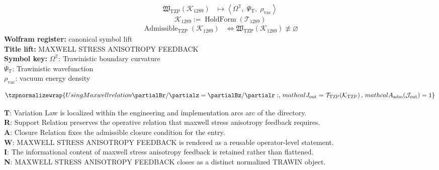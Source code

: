 \noindent
\begin{minipage}[t]{0.48\linewidth}
\begingroup
\small
\[
\begin{aligned}
\mathfrak{W}_{\mathrm{TZP}}\!\left(\mathcal{K}_{1289}\right)
&\longmapsto
\left\langle \Omega^{\mathbb{T}},\; \Psi_{\mathrm{T}},\; \rho_{\mathrm{vac}} \right\rangle
\end{aligned}
\]
\[
\mathcal{K}_{1289}
:=
\operatorname{HoldForm}\!\left(\mathcal{T}_{1289}\right)
\]
\[
\begin{aligned}
\operatorname{Admissible}_{\mathrm{TZP}}\!\left(\mathcal{K}_{1289}\right)
&\Longleftrightarrow
\mathfrak{W}_{\mathrm{TZP}}\!\left(\mathcal{K}_{1289}\right)\not\equiv\varnothing
\end{aligned}
\]
\textbf{Wolfram register:} canonical symbol lift\\
\textbf{Title lift:} MAXWELL STRESS ANISOTROPY FEEDBACK\\
\textbf{Symbol key:} \(\Omega^{\mathbb{T}}\): Trawinistic boundary curvature\\ \(\Psi_{\mathrm{T}}\): Trawinistic wavefunction\\ \(\rho_{\mathrm{vac}}\): vacuum energy density
\par
\endgroup
\end{minipage}\hfill
\begin{minipage}[t]{0.48\linewidth}
\[
\tzpnormalizewrap{Using Maxwell relation \partialBr/\partialz = \partialBz/\partialr:,\,mathcal{J}_{\mathrm{out}} = \mathcal{T}_{\mathrm{TZP}}\!\left(\mathcal{K}_{\mathrm{TZP}}\right),\,mathcal{A}_{\mathrm{adm}}\!\left(\mathcal{J}_{\mathrm{out}}\right)=1}
\]

\small
\textbf{T}: Variation Law is localized within the engineering and implementation arcs arc of the directory.\\
\textbf{R}: Support Relation preserves the operative relation that maxwell stress anisotropy feedback requires.\\
\textbf{A}: Closure Relation fixes the admissible closure condition for the entry.\\
\textbf{W}: MAXWELL STRESS ANISOTROPY FEEDBACK is rendered as a reusable operator-level statement.\\
\textbf{I}: The informational content of maxwell stress anisotropy feedback is retained rather than flattened.\\
\textbf{N}: MAXWELL STRESS ANISOTROPY FEEDBACK closes as a distinct normalized TRAWIN object.
\normalsize
\end{minipage}

